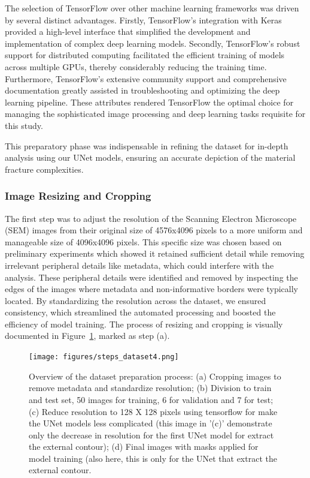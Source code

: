 \documentclass[preprint,12pt]{elsarticle}
\begin{document}
The selection of TensorFlow over other machine learning frameworks was driven by several distinct advantages. Firstly, TensorFlow’s integration with Keras provided a high-level interface that simplified the development and implementation of complex deep learning models. Secondly, TensorFlow's robust support for distributed computing facilitated the efficient training of models across multiple GPUs, thereby considerably reducing the training time. Furthermore, TensorFlow's extensive community support and comprehensive documentation greatly assisted in troubleshooting and optimizing the deep learning pipeline. These attributes rendered TensorFlow the optimal choice for managing the sophisticated image processing and deep learning tasks requisite for this study.

This preparatory phase was indispensable in refining the dataset for in-depth analysis using our UNet models, ensuring an accurate depiction of the material fracture complexities.

\subsubsection{Image Resizing and Cropping}
The first step was to adjust the resolution of the Scanning Electron Microscope (SEM) images from their original size of 4576x4096 pixels to a more uniform and manageable size of 4096x4096 pixels. This specific size was chosen based on preliminary experiments which showed it retained sufficient detail while removing irrelevant peripheral details like metadata, which could interfere with the analysis. These peripheral details were identified and removed by inspecting the edges of the images where metadata and non-informative borders were typically located. By standardizing the resolution across the dataset, we ensured consistency, which streamlined the automated processing and boosted the efficiency of model training. The process of resizing and cropping is visually documented in Figure~\ref{steps_was_done}, marked as step (a).

\begin{figure}[h!]
  \centering
  \texttt{[image: figures/steps\_dataset4.png]}
  \caption{Overview of the dataset preparation process: (a) Cropping images to remove metadata and standardize resolution; (b) Division to train and test set, 50 images for training, 6 for validation and 7 for test; (c) Reduce resolution to 128 X 128 pixels using tensorflow for make the UNet models less complicated (this image in '(c)' demonstrate only the decrease in resolution for the first UNet model for extract the external contour); (d) Final images with masks applied for model training (also here, this is only for the UNet that extract the external contour.}
  \label{steps_was_done}
\end{figure}
\end{document}
